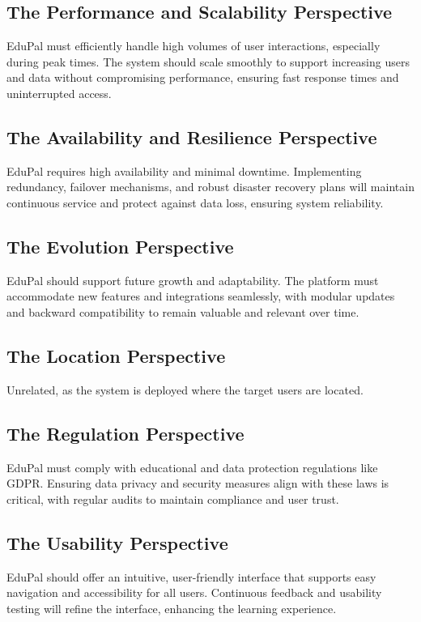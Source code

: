 \subsection{The Performance and Scalability Perspective}

EduPal must efficiently handle high volumes of user interactions, especially during peak times. The system should scale smoothly to support increasing users and data without compromising performance, ensuring fast response times and uninterrupted access.


\subsection{The Availability and Resilience Perspective}

EduPal requires high availability and minimal downtime. Implementing redundancy, failover mechanisms, and robust disaster recovery plans will maintain continuous service and protect against data loss, ensuring system reliability.


\subsection{The Evolution Perspective}

EduPal should support future growth and adaptability. The platform must accommodate new features and integrations seamlessly, with modular updates and backward compatibility to remain valuable and relevant over time.


\subsection{The Location Perspective}

Unrelated, as the system is deployed where the target users are located.


\subsection{The Regulation Perspective}

EduPal must comply with educational and data protection regulations like GDPR. Ensuring data privacy and security measures align with these laws is critical, with regular audits to maintain compliance and user trust.


\subsection{The Usability Perspective}

EduPal should offer an intuitive, user-friendly interface that supports easy navigation and accessibility for all users. Continuous feedback and usability testing will refine the interface, enhancing the learning experience.
